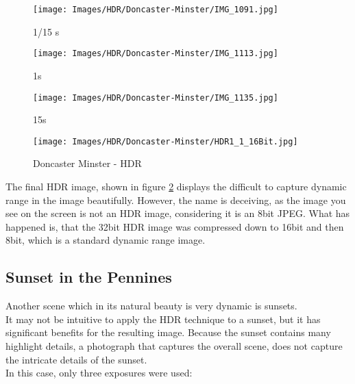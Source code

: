 \begin{figure}[htb]
\begin{minipage}{.32\textwidth}
	\centering
		\texttt{[image: Images/HDR/Doncaster-Minster/IMG\_1091.jpg]}
	\caption{1/15 s}
	\label{fig:IMG_1091}
\end{minipage}
\begin{minipage}{.32\textwidth}
	\centering
		\texttt{[image: Images/HDR/Doncaster-Minster/IMG\_1113.jpg]}
	\caption{1s}
	\label{fig:IMG_1113}
\end{minipage}
\begin{minipage}{.32\textwidth}
	\centering
		\texttt{[image: Images/HDR/Doncaster-Minster/IMG\_1135.jpg]}
	\caption{15s}
	\label{fig:IMG_1135}
\end{minipage}
\end{figure}



\begin{figure}[htb]
	\centering
		\texttt{[image: Images/HDR/Doncaster-Minster/HDR1\_1\_16Bit.jpg]}
	\caption{Doncaster Minster - HDR}
	\label{fig:HDR1_1_16Bit}
\end{figure}

The final \gls{HDR} image, shown in figure \ref{fig:HDR1_1_16Bit} displays the difficult to capture dynamic range in the image beautifully. However, the name is deceiving, as the image you see on the screen is not an \gls{HDR} image, considering it is an 8bit \gls{JPEG}. What has happened is, that the 32bit \gls{HDR} image was compressed down to 16bit and then 8bit, which is a standard dynamic range image.

\subsection{Sunset in the Pennines}

Another scene which in its natural beauty is very dynamic is sunsets.
\\
It may not be intuitive to apply the \gls{HDR} technique to a sunset, but it has significant benefits for the resulting image. Because the sunset contains many highlight details, a photograph that captures the overall scene, does not capture the intricate details of the sunset.
\\[\baselineskip]
In this case, only three \glspl{exposure} were used:

